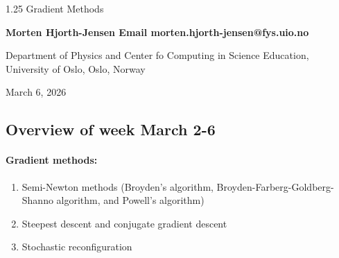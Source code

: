 \documentclass[%
oneside,                 %
final,                   %
10pt]{article}
\begin{document}

\newcommand{\exercisesection}[1]{\subsection*{#1}}






\thispagestyle{empty}

\begin{center}
{\LARGE\bf
\begin{spacing}{1.25}
Gradient Methods
\end{spacing}
}
\end{center}


\begin{center}
{\bf Morten Hjorth-Jensen  Email morten.hjorth-jensen@fys.uio.no}
\end{center}

    \begin{center}
\centerline{{\small Department of Physics and Center fo Computing in Science Education, University of Oslo, Oslo, Norway}}
\end{center}
    

\begin{center}
March 6, 2026
\end{center}

\vspace{1cm}


\subsection*{Overview of week March 2-6}

\paragraph{Gradient methods:}
\begin{enumerate}
\item Semi-Newton methods (Broyden's algorithm, Broyden-Farberg-Goldberg-Shanno algorithm, and Powell's algorithm)

\item Steepest descent and conjugate gradient descent

\item Stochastic reconfiguration
\end{enumerate}
\end{document}
